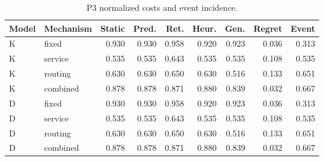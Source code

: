\begin{table}[htbp]\caption{P3 normalized costs and event incidence.}\centering\small\setlength{\tabcolsep}{3pt}

\begin{tabular}{llrrrrrrr}\toprule

Model & Mechanism & Static & Pred. & Ret. & Heur. & Gen. & Regret & Event\\\midrule

K & fixed & 0.930 & 0.930 & 0.958 & 0.920 & 0.923 & 0.036 & 0.313\\

K & service & 0.535 & 0.535 & 0.643 & 0.535 & 0.535 & 0.108 & 0.535\\

K & routing & 0.630 & 0.630 & 0.650 & 0.630 & 0.516 & 0.133 & 0.651\\

K & combined & 0.878 & 0.878 & 0.871 & 0.880 & 0.839 & 0.032 & 0.667\\

D & fixed & 0.930 & 0.930 & 0.958 & 0.920 & 0.923 & 0.036 & 0.313\\

D & service & 0.535 & 0.535 & 0.643 & 0.535 & 0.535 & 0.108 & 0.535\\

D & routing & 0.630 & 0.630 & 0.650 & 0.630 & 0.516 & 0.133 & 0.651\\

D & combined & 0.878 & 0.878 & 0.871 & 0.880 & 0.839 & 0.032 & 0.667\\

\bottomrule\end{tabular}\end{table}

